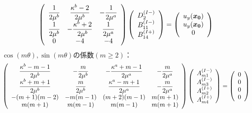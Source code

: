 \begin{align}
	\left(
	\begin{array}{ccc}
		{\displaystyle\frac{1}{2\mu^b}}& {\displaystyle\frac{\kappa^b-2}{2\mu^b}} & {\displaystyle-\frac{1}{2\mu^a}} \\
		{\displaystyle\frac{1}{2\mu^b}} & {\displaystyle-\frac{\kappa^b+2}{2\mu^b}} & {\displaystyle\frac{1}{2\mu^a}} \\
		0 & -4 & -4 \\
	\end{array}
	\right)
	\left(
	\begin{array}{c}
		D_{2}^{(I-)} \\
	 	B_{11}^{(I-)} \\
	 	B_{14}^{(I+)} \\
	\end{array}
	\right)
	=
	\left(
	\begin{array}{c}
		u_{y}(\bm{x_{0}}) \\
	 	u_{y}(\bm{x_{0}}) \\
	 	0 \\
	\end{array}
	\right)
\end{align}
\newpage
$\cos(m\theta),\sin(m\theta)$の係数$(m\geq2)$：
\begin{align}
	\left(
	\begin{array}{cccc}
		{\displaystyle\frac{ \kappa^b-m-1}{2\mu^{b}}}& {\displaystyle-\frac{m}{2\mu^{b}}} &
		{\displaystyle-\frac{\kappa^a+m-1}{2\mu^{a}}} & {\displaystyle-\frac{m}{2\mu^{a}}} \\
		{\displaystyle\frac{\kappa^b+m+1}{2\mu^{b}}} & {\displaystyle\frac{m}{2\mu^{b}}} &
		{\displaystyle\frac{\kappa^a-m+1}{2\mu^{a}}} & {\displaystyle-\frac{m}{2\mu^{a}}} \\
		-(m+1)(m-2) & -m(m-1) & (m+2)(m-1) & m(m+1) \\
		m(m+1) & m(m-1) & m(m-1) & m(m+1)\\
	\end{array}
	\right)
	\left(
	\begin{array}{c}
		A_{m1}^{(I-)} \\
	 	A_{m3}^{(I-)} \\
		A_{m2}^{(I+)}\\
	 	A_{m4}^{(I+)} \\
	\end{array}
	\right)
	=
	\left(
	\begin{array}{c}
		0 \\
	 	0 \\
		0 \\
	 	0 \\
	\end{array}
	\right)
\end{align}
